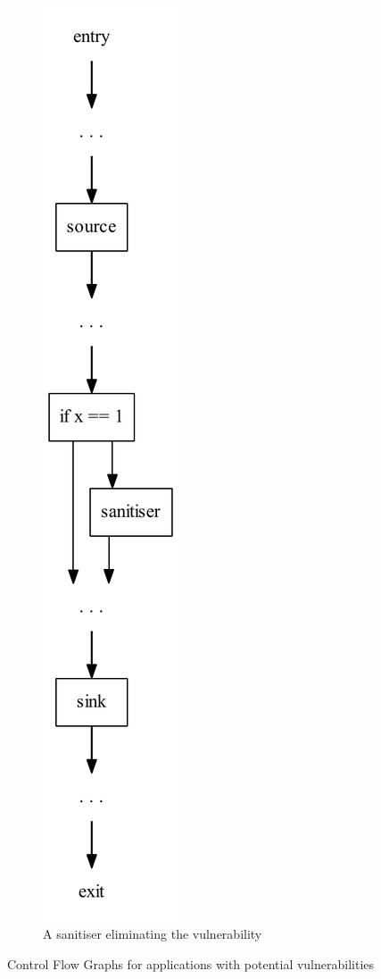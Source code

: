 \begin{figure}
\begin{subfigure}[b]{0.5\textwidth}
  \end{subfigure}
  ~
  \begin{subfigure}[b]{0.5\textwidth}
    \centering
    \includegraphics[scale=0.8]{figures/dot_files/sanitised_with_flow.pdf}
    \caption{A sanitiser eliminating the vulnerability}
    \label{vulnerabilities_sanitised}
  \end{subfigure}
  
  \caption{Control Flow Graphs for applications with potential vulnerabilities}
\end{figure}
